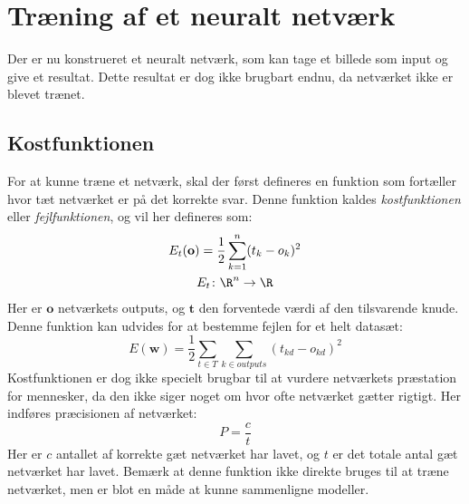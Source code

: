 \documentclass[../SOP.tex]{subfile}
\begin{document}
\section{Træning af et neuralt netværk}
Der er nu konstrueret et neuralt netværk, som kan tage et billede som input og give et resultat. Dette resultat er dog ikke brugbart endnu, da netværket ikke er blevet trænet.
\subsection{Kostfunktionen}
For at kunne træne et netværk, skal der først defineres en funktion som fortæller hvor tæt netværket er på det korrekte svar. Denne funktion kaldes \emph{kostfunktionen} eller \emph{fejlfunktionen}, og vil her defineres som:
\begin{gather}
  E_t(\mathbf{o})=\frac{1}{2}\sum_{k=1}^n(t_k-o_k)^2 \label{eq:cost}\\
  E_t\colon \R^n\rightarrow\R\nonumber
\end{gather}
Her er $\mathbf{o}$ netværkets outputs, og $\mathbf{t}$ den forventede værdi af den tilsvarende knude.\\
Denne funktion kan udvides for at bestemme fejlen for et helt datasæt:
\begin{equation}
  E(\mathbf{w})=\frac{1}{2}\sum_{t\in T}\sum_{k\in outputs}(t_{kd}-o_{kd})^2
  \label{eq:costset}
\end{equation}
Kostfunktionen er dog ikke specielt brugbar til at vurdere netværkets præstation for mennesker, da den ikke siger noget om hvor ofte netværket gætter rigtigt. Her indføres præcisionen af netværket:
\begin{equation*}
  P=\frac{c}{t}
\end{equation*}
Her er $c$ antallet af korrekte gæt netværket har lavet, og $t$ er det totale antal gæt netværket har lavet. Bemærk at denne funktion ikke direkte bruges til at træne netværket, men er blot en måde at kunne sammenligne modeller.
\end{document}
